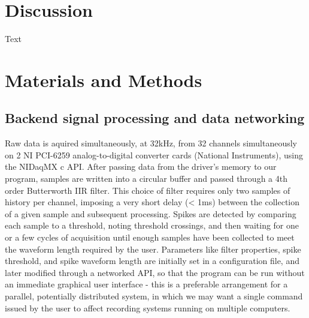 \documentclass[10pt]{article}
\begin{document}
\section*{Discussion}
Text


\section*{Materials and Methods}

\subsection*{Backend signal processing and data networking}
Raw data is aquired simultaneously, at 32kHz, from 32 channels simultaneously on 2 NI PCI-6259 analog-to-digital converter cards (National Instruments), using the NIDaqMX c API. After passing data from the driver's memory to our program, samples are written into a circular buffer and passed through a 4th order Butterworth IIR filter. This choice of filter requires only two samples of history per channel, imposing a very short delay (< 1ms) between the collection of a given sample and subsequent processing. Spikes are detected by comparing each sample to a threshold, noting threshold crossings, and then waiting for one or a few cycles of acquisition until enough samples have been collected to meet the waveform length required by the user. Parameters like filter properties, spike threshold, and spike waveform length are initially set in a configuration file, and later modified through a networked API, so that the program can be run without an immediate graphical user interface - this is a preferable arrangement for a parallel, potentially distributed system, in which we may want a single command issued by the user to affect recording systems running on multiple computers.
\end{document}
